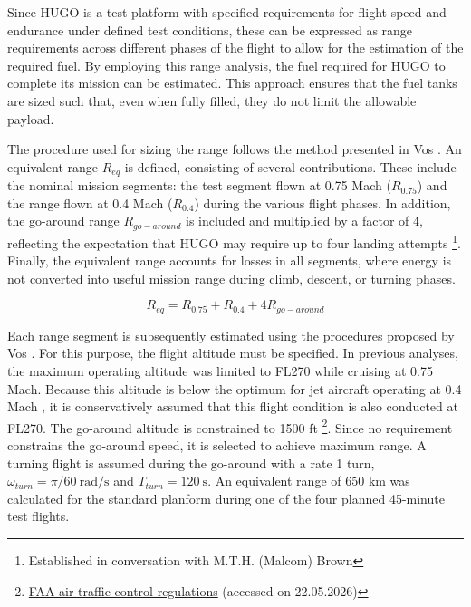 Since HUGO is a test platform with specified requirements for flight speed and endurance under defined test conditions, these can be expressed as range requirements across different phases of the flight to allow for the estimation of the required fuel. By employing this range analysis, the fuel required for HUGO to complete its mission can be estimated. This approach ensures that the fuel tanks are sized such that, even when fully filled, they do not limit the allowable payload.

The procedure used for sizing the range follows the method presented in Vos \cite{Vos}. An equivalent range $R_{eq}$ is defined, consisting of several contributions. These include the nominal mission segments: the test segment flown at 0.75 Mach ($R_{0.75}$) and the range flown at 0.4 Mach ($R_{0.4}$) during the various flight phases. In addition, the go-around range $R_{go-around}$ is included and multiplied by a factor of 4, reflecting the expectation that HUGO may require up to four landing attempts \footnote{Established in conversation with M.T.H. (Malcom) Brown}. Finally, the equivalent range accounts for losses in all segments, where energy is not converted into useful mission range during climb, descent, or turning phases.

\begin{equation}
    R_{eq} = R_{0.75} + R_{0.4} + 4 R_{go-around}
    \label{eq:range}
\end{equation}

Each range segment is subsequently estimated using the procedures proposed by Vos \cite{Vos}. For this purpose, the flight altitude must be specified. In previous analyses, the maximum operating altitude was limited to FL270 while cruising at 0.75 Mach. Because this altitude is below the optimum for jet aircraft operating at 0.4 Mach \cite{Koutz1952Loitering}, it is conservatively assumed that this flight condition is also conducted at FL270. The go-around altitude is constrained to 1500 ft \footnote{\href{https://www.faa.gov/air_traffic/publications/atpubs/aim_html/chap4_section_3.html?utm_source=chatgpt.com}{FAA air traffic control regulations} (accessed on 22.05.2026)}. Since no requirement constrains the go-around speed, it is selected to achieve maximum range. A turning flight is assumed during the go-around with a rate 1 turn, $\omega_{turn} = \pi/60\ \text{rad/s}$ and $T_{turn} = 120\ \text{s}$. An equivalent range of 650 km was calculated for the standard planform during one of the four planned 45-minute test flights.

